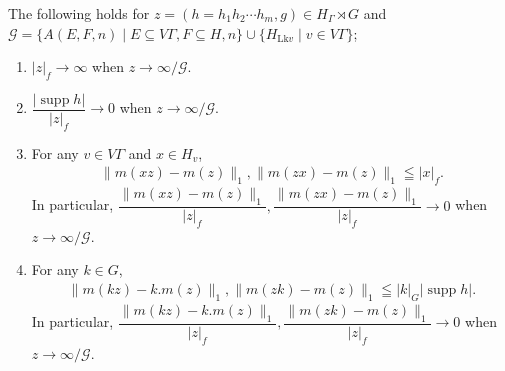 \documentclass[10pt,a4paper]{amsart}
\renewcommand{\subset}{\subseteq}
\begin{document}
\begin{proposition}
The following holds for $z=(h=h_1h_2\cdots h_m, g)\in H_{\Gamma}\rtimes G$ and
$\mathcal{G}=\{ A(E, F, n) \mid E\subset V\Gamma, F\subset H, n\} \cup\{ H_{\mathrm{Lk}v}\mid v\in V\Gamma\}$; 
\begin{enumerate}
\item $|z|_f\to \infty$ when $z\to \infty/\mathcal{G}$. 

\item $\dfrac{|\mathop{supp}h|}{|z|_f} \to 0$ when $z\to \infty/\mathcal{G}$. 

\item For any $v\in V\Gamma$ and $x\in H_v$, 
\begin{align}
\| m(xz)-m(z) \|_1, \| m(zx)-m(z) \|_1 \leqq |x|_f.  
\end{align}
In particular, $\dfrac{\| m(xz)-m(z) \|_1}{|z|_f}, \dfrac{\| m(zx)-m(z) \|_1}{|z|_f} \to 0$ when $z\to \infty/\mathcal{G}$.
\item For any $k\in G$, 
\begin{align}
\| m(kz)-k.m(z) \|_1, \| m(zk)-m(z) \|_1\leqq |k|_G|\mathop{supp}h|. 
\end{align}
In particular, $\dfrac{\| m(kz)-k.m(z) \|_1}{|z|_f}, \dfrac{\| m(zk)-m(z) \|_1}{|z|_f} \to 0$ when $z\to \infty/\mathcal{G}$.
\end{enumerate}
\end{proposition}
\end{document}
